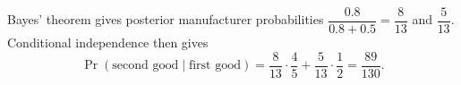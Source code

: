 Bayes' theorem gives posterior manufacturer probabilities $\dfrac{0.8}{0.8+0.5}=\dfrac{8}{13}$ and $\dfrac{5}{13}$. Conditional independence then gives
\[
\Pr(\text{second good}\mid\text{first good})
=\dfrac{8}{13}\cdot\dfrac{4}{5}+\dfrac{5}{13}\cdot\dfrac{1}{2}
=\boxed{\dfrac{89}{130}}.
\]
